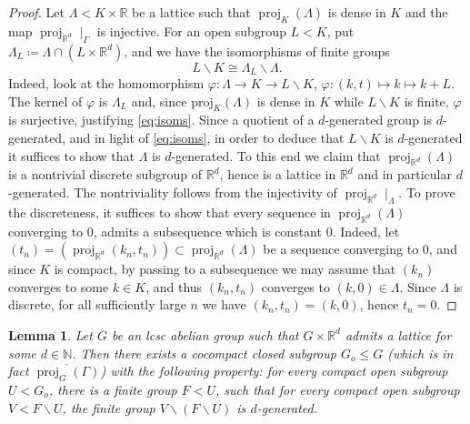\documentclass{amsart}
\numberwithin{equation}{subsection}
\newtheorem{lem}[thm]{Lemma}
\theoremstyle{remark}
\begin{document}
\begin{proof}
Let \(\Lambda<K\times\mathbb{R}\) be a lattice such that \(\operatorname{proj}_{K}\left(\Lambda\right)\) is dense in \(K\) and the map \(\operatorname{proj}_{\mathbb{R}^{d}}\mid_{\Gamma}\) is injective. For an open subgroup \(L<K\), put \(\Lambda_{L}\coloneqq\Lambda\cap\left(L\times\mathbb{R}^{d}\right)\), and we have the isomorphisms of finite groups
\begin{equation}\label{eq:isoms}
L\backslash K\cong\Lambda_{L}\backslash\Lambda.
\end{equation}
Indeed, look at the homomorphism \(\varphi:\Lambda\to K\to L\backslash K\), \(\varphi:\left(k,t\right)\mapsto k \mapsto k+L\). The kernel of \(\varphi\) is \(\Lambda_{L}\) and, since \(\mathrm{proj}_{K}\left(\Lambda\right)\) is dense in \(K\) while \(L\backslash K\) is finite, \(\varphi\) is surjective, justifying \eqref{eq:isoms}. Since a quotient of a \(d\)-generated group is \(d\)-generated, and in light of \eqref{eq:isoms}, in order to deduce that \(L\backslash K\) is \(d\)-generated it suffices to show that \(\Lambda\) is \(d\)-generated. To this end we claim that \(\operatorname{proj}_{\mathbb{R}^{d}}\left(\Lambda\right)\) is a nontrivial discrete subgroup of \(\mathbb{R}^{d}\), hence is a lattice in \(\mathbb{R}^{d}\) and in particular \(d\)-generated. The nontriviality follows from the injectivity of \(\operatorname{proj}_{\mathbb{R}^{d}}\mid_{\Lambda}\). To prove the discreteness, it suffices to show that every sequence in \(\operatorname{proj}_{\mathbb{R}^{d}}\left(\Lambda\right)\) converging to \(0\), admits a subsequence which is constant \(0\). Indeed, let \(\left(t_{n}\right)=\left(\operatorname{proj}_{\mathbb{R}^{d}}\left(k_{n},t_{n}\right)\right)\subset\operatorname{proj}_{\mathbb{R}^{d}}\left(\Lambda\right)\) be a sequence converging to \(0\), and since \(K\) is compact, by passing to a subsequence we may assume that \(\left(k_{n}\right)\) converges to some \(k\in K\), and thus \(\left(k_{n},t_{n}\right)\) converges to \(\left(k,0\right)\in\Lambda\). Since \(\Lambda\) is discrete, for all sufficiently large \(n\) we have \(\left(k_{n},t_{n}\right)=\left(k,0\right)\), hence \(t_{n}=0\).
\end{proof}

\begin{lem}\label{lem:cyclicity2}
Let \(G\) be an lcsc abelian group such that \(G\times\mathbb{R}^{d}\) admits a lattice for some \(d\in\mathbb{N}\). Then there exists a cocompact closed subgroup \(G_{o}\leq G\) (which is in fact \(\overline{\operatorname{proj}_{G}\left(\Gamma\right)}\)) with the following property: for every compact open subgroup \(U<G_{o}\), there is a finite group \(F<U\), such that for every compact open subgroup \(V<F\backslash U\), the finite group \(V\backslash\left(F\backslash U\right)\) is \(d\)-generated.
\end{lem}
\end{document}
